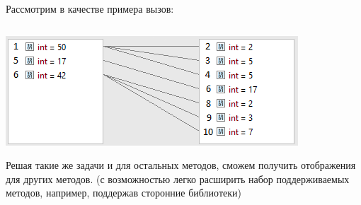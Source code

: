 \begin{frame}
\frametitle{\insertsection} 
\framesubtitle{\insertsubsection}
Рассмотрим в качестве примера вызов:
\inputminted{java}{code/FlatMapFactorizeExample.java}
\includegraphics[scale=0.8]{img/flatMapExample.png}

Решая такие же задачи и для остальных методов, сможем получить отображения для других методов. (с возможностью легко расширить набор поддерживаемых методов, например, поддержав сторонние библиотеки)
\end{frame}

